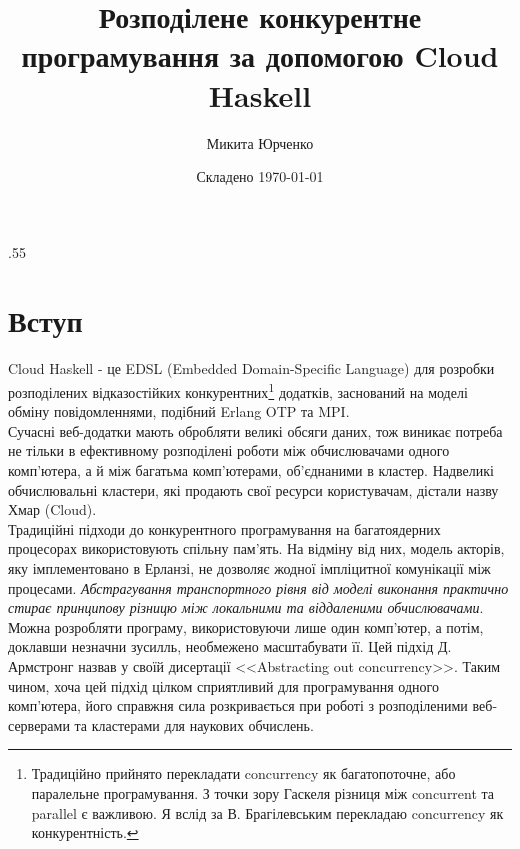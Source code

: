 \documentclass[12pt]{article}
\title{Розподілене конкурентне програмування 
    за допомогою Cloud Haskell}
\author{Микита Юрченко}
\date{Складено \today}
\begin{document}
\newtheorem*{definition}{Визначення}
\newtheorem*{theorem}{Теорема}
\newtheorem*{corollary}{Наслідок}
\newtheorem*{axiom}{Аксіома}
\newtheorem*{notation}{Нотація}
\renewenvironment{proof}{{\bfseries Доказ}}

\setlength{\epigraphwidth}{.55\textwidth}

\maketitle

\tableofcontents

\section{Вступ}

Cloud Haskell - це EDSL (Embedded Domain-Specific Language) для розробки розподілених відказостійких 
конкурентних\footnote{Традиційно прийнято перекладати concurrency як багатопоточне, або паралельне 
програмування. З точки зору Гаскеля різниця між concurrent та parallel є важливою\cite{marlow}. 
Я вслід за В. Брагілевським перекладаю concurrency як конкурентність\cite{bravit}.} додатків, заснований 
на моделі обміну повідомленнями, подібний Erlang OTP \cite{haskellInCloud}\cite{epsteinThesis} та MPI.\\ 

Сучасні веб-додатки мають обробляти великі обсяги даних, тож виникає потреба не тільки в ефективному 
розподілені роботи між обчислювачами одного комп'ютера, а й між багатьма комп'ютерами, об'єднаними в 
кластер. Надвеликі обчислювальні кластери, які продають свої ресурси користувачам, дістали назву Хмар 
(Cloud).\\

Традиційні підходи до конкурентного програмування на багатоядерних процесорах використовують спільну пам'ять. 
На відміну від них, модель акторів, яку імплементовано в Ерланзі, не дозволяє жодної імпліцитної комунікації 
між процесами. \textit{Абстрагування транспортного рівня від моделі виконання практично стирає принципову 
різницю між локальними та віддаленими обчислювачами}. Можна розробляти програму, використовуючи лише один 
комп'ютер, а потім, доклавши незначни зусилль, необмежено масштабувати її. Цей підхід Д. Армстронг назвав 
у своїй дисертації <<Abstracting out concurrency>>\cite{armstrongThesis}. Таким чином, хоча цей підхід 
цілком сприятливий для програмування одного комп'ютера, його справжня сила розкривається при роботі з 
розподіленими веб-серверами та кластерами для наукових обчислень.\\
\end{document}
